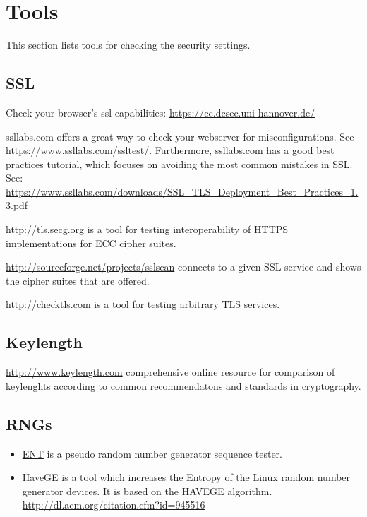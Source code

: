 \section{Tools}

This section lists tools for checking the security settings.

\subsection{SSL}

Check your browser's ssl capabilities: \url{https://cc.dcsec.uni-hannover.de/}


ssllabs.com offers a great way to check your webserver for misconfigurations. See \url{https://www.ssllabs.com/ssltest/}.
Furthermore, ssllabs.com has a good best practices tutorial, which focuses on avoiding the most common mistakes in SSL.
See: \url{https://www.ssllabs.com/downloads/SSL_TLS_Deployment_Best_Practices_1.3.pdf}

\url{http://tls.secg.org} is a tool for testing interoperability of HTTPS implementations for ECC cipher suites.

\url{http://sourceforge.net/projects/sslscan} connects to a given SSL
service and shows the cipher suites that are offered.

\url{http://checktls.com} is a tool for testing arbitrary TLS services. 

\subsection{Keylength}

\url{http://www.keylength.com} comprehensive online resource for comparison of keylenghts according to common recommendatons and standards in cryptography.

\subsection{RNGs}

\begin{itemize}
\item \href{http://www.fourmilab.ch/random/}{ENT} is a pseudo random number generator sequence tester.  
\item \href{http://www.issihosts.com/haveged/}{HaveGE} is a tool which increases the Entropy of the Linux random number generator devices. It is based on the HAVEGE algorithm. \url{http://dl.acm.org/citation.cfm?id=945516}
\end{itemize}



